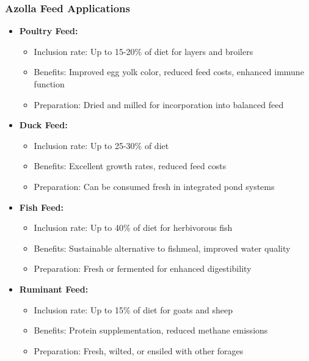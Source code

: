 \subsubsection{Azolla Feed Applications}
\begin{itemize}
    \item \textbf{Poultry Feed:}
    \begin{itemize}
        \item Inclusion rate: Up to 15-20\% of diet for layers and broilers
        \item Benefits: Improved egg yolk color, reduced feed costs, enhanced immune function
        \item Preparation: Dried and milled for incorporation into balanced feed
    \end{itemize}
    
    \item \textbf{Duck Feed:}
    \begin{itemize}
        \item Inclusion rate: Up to 25-30\% of diet
        \item Benefits: Excellent growth rates, reduced feed costs
        \item Preparation: Can be consumed fresh in integrated pond systems
    \end{itemize}
    
    \item \textbf{Fish Feed:}
    \begin{itemize}
        \item Inclusion rate: Up to 40\% of diet for herbivorous fish
        \item Benefits: Sustainable alternative to fishmeal, improved water quality
        \item Preparation: Fresh or fermented for enhanced digestibility
    \end{itemize}
    
    \item \textbf{Ruminant Feed:}
    \begin{itemize}
        \item Inclusion rate: Up to 15\% of diet for goats and sheep
        \item Benefits: Protein supplementation, reduced methane emissions
        \item Preparation: Fresh, wilted, or ensiled with other forages
    \end{itemize}
\end{itemize}

